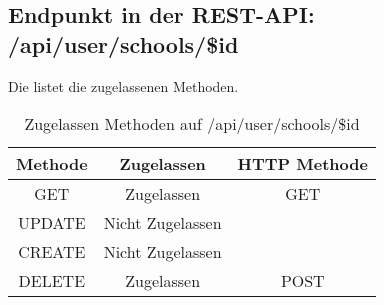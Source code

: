 \subsection{Endpunkt in der REST-API: /api/user/schools/\$id}
Die  listet die zugelassenen Methoden. 

\begin{table}[!htbp]
	\begin{tabular}{|c|c|c|}
		\hline
			\textbf{Methode} & \textbf{Zugelassen} & \textbf{HTTP Methode} \\ \hline
			GET & Zugelassen & GET \\ \hline
			UPDATE & Nicht Zugelassen & \\ \hline 
			CREATE & Nicht Zugelassen & \\ \hline 
			DELETE & Zugelassen & POST \\ \hline
	\end{tabular}

		\caption{Zugelassen Methoden auf /api/user/schools/\$id}
		\label{tab:end:rest:api:user:schools:id:meth}
\end{table}